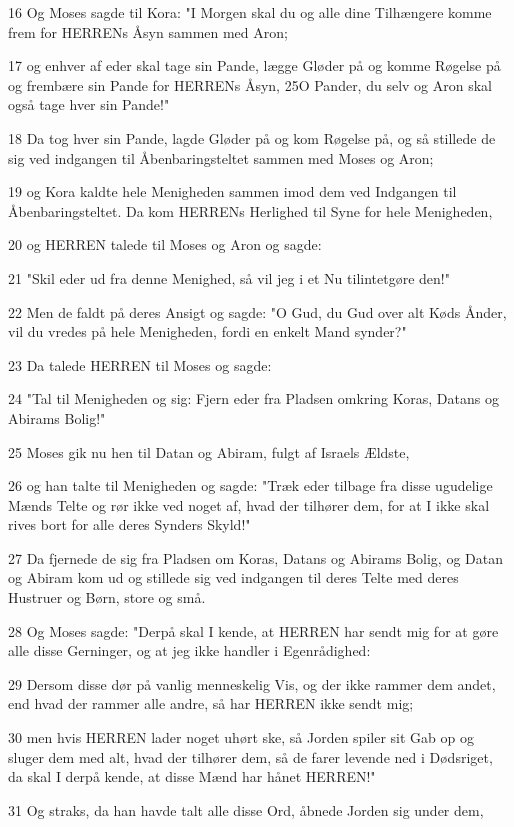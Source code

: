 \par 16 Og Moses sagde til Kora: "I Morgen skal du og alle dine Tilhængere komme frem for HERRENs Åsyn sammen med Aron;
\par 17 og enhver af eder skal tage sin Pande, lægge Gløder på og komme Røgelse på og frembære sin Pande for HERRENs Åsyn, 25O Pander, du selv og Aron skal også tage hver sin Pande!"
\par 18 Da tog hver sin Pande, lagde Gløder på og kom Røgelse på, og så stillede de sig ved indgangen til Åbenbaringsteltet sammen med Moses og Aron;
\par 19 og Kora kaldte hele Menigheden sammen imod dem ved Indgangen til Åbenbaringsteltet. Da kom HERRENs Herlighed til Syne for hele Menigheden,
\par 20 og HERREN talede til Moses og Aron og sagde:
\par 21 "Skil eder ud fra denne Menighed, så vil jeg i et Nu tilintetgøre den!"
\par 22 Men de faldt på deres Ansigt og sagde: "O Gud, du Gud over alt Køds Ånder, vil du vredes på hele Menigheden, fordi en enkelt Mand synder?"
\par 23 Da talede HERREN til Moses og sagde:
\par 24 "Tal til Menigheden og sig: Fjern eder fra Pladsen omkring Koras, Datans og Abirams Bolig!"
\par 25 Moses gik nu hen til Datan og Abiram, fulgt af Israels Ældste,
\par 26 og han talte til Menigheden og sagde: "Træk eder tilbage fra disse ugudelige Mænds Telte og rør ikke ved noget af, hvad der tilhører dem, for at I ikke skal rives bort for alle deres Synders Skyld!"
\par 27 Da fjernede de sig fra Pladsen om Koras, Datans og Abirams Bolig, og Datan og Abiram kom ud og stillede sig ved indgangen til deres Telte med deres Hustruer og Børn, store og små.
\par 28 Og Moses sagde: "Derpå skal I kende, at HERREN har sendt mig for at gøre alle disse Gerninger, og at jeg ikke handler i Egenrådighed:
\par 29 Dersom disse dør på vanlig menneskelig Vis, og der ikke rammer dem andet, end hvad der rammer alle andre, så har HERREN ikke sendt mig;
\par 30 men hvis HERREN lader noget uhørt ske, så Jorden spiler sit Gab op og sluger dem med alt, hvad der tilhører dem, så de farer levende ned i Dødsriget, da skal I derpå kende, at disse Mænd har hånet HERREN!"
\par 31 Og straks, da han havde talt alle disse Ord, åbnede Jorden sig under dem,
